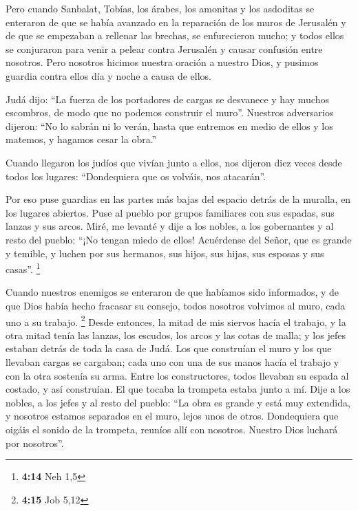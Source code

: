 \begin{paracol}{2}
 Pero cuando Sanbalat, Tobías, los árabes, los amonitas y
los asdoditas se enteraron de que se había avanzado en la reparación de
los muros de Jerusalén y de que se empezaban a rellenar las brechas, se
enfurecieron mucho;  y todos ellos se conjuraron para
venir a pelear contra Jerusalén y causar confusión entre nosotros.
 Pero nosotros hicimos nuestra oración a nuestro Dios, y
pusimos guardia contra ellos día y noche a causa de ellos.

 Judá dijo: ``La fuerza de los portadores de cargas se
desvanece y hay muchos escombros, de modo que no podemos construir el
muro''.  Nuestros adversarios dijeron: ``No lo sabrán ni
lo verán, hasta que entremos en medio de ellos y los matemos, y hagamos
cesar la obra.''

 Cuando llegaron los judíos que vivían junto a ellos, nos
dijeron diez veces desde todos los lugares: ``Dondequiera que os
volváis, nos atacarán''.

 Por eso puse guardias en las partes más bajas del
espacio detrás de la muralla, en los lugares abiertos. Puse al pueblo
por grupos familiares con sus espadas, sus lanzas y sus arcos.
 Miré, me levanté y dije a los nobles, a los gobernantes
y al resto del pueblo: ``¡No tengan miedo de ellos! Acuérdense del
Señor, que es grande y temible, y luchen por sus hermanos, sus hijos,
sus hijas, sus esposas y sus casas''. \footnote{\textbf{4:14} Neh 1,5}

 Cuando nuestros enemigos se enteraron de que habíamos
sido informados, y de que Dios había hecho fracasar su consejo, todos
nosotros volvimos al muro, cada uno a su trabajo. \footnote{\textbf{4:15}
  Job 5,12}  Desde entonces, la mitad de mis siervos
hacía el trabajo, y la otra mitad tenía las lanzas, los escudos, los
arcos y las cotas de malla; y los jefes estaban detrás de toda la casa
de Judá.  Los que construían el muro y los que llevaban
cargas se cargaban; cada uno con una de sus manos hacía el trabajo y con
la otra sostenía su arma.  Entre los constructores, todos
llevaban su espada al costado, y así construían. El que tocaba la
trompeta estaba junto a mí.  Dije a los nobles, a los
jefes y al resto del pueblo: ``La obra es grande y está muy extendida, y
nosotros estamos separados en el muro, lejos unos de otros.
 Dondequiera que oigáis el sonido de la trompeta, reuníos
allí con nosotros. Nuestro Dios luchará por nosotros''.


\end{paracol}
